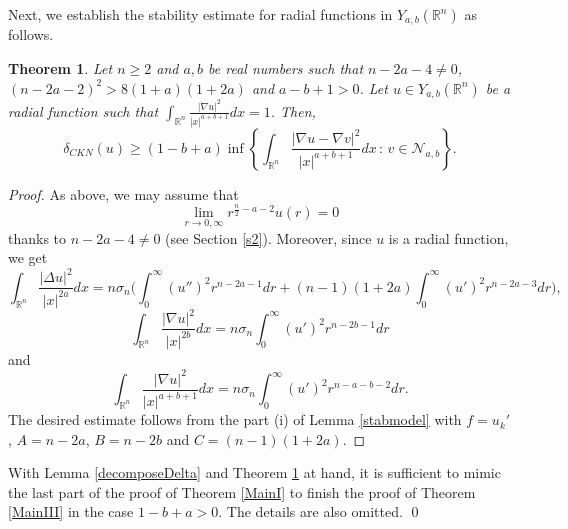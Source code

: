\documentclass[a4paper,12pt]{article}
\theoremstyle{plain}
\newtheorem{theorem}{Theorem}[section]
\theoremstyle{definition}
\theoremstyle{remark}
\def\R{\mathbb R}%
\def\irn{\int_{\R^n}}
\numberwithin{equation}{section}
\begin{document}
Next, we establish the stability estimate for radial functions in $Y_{a,b}(\R^n)$ as follows.
\begin{theorem}\label{radialtheoDelta}
Let $n\geq 2$ and $a, b$ be real numbers such that $n-2a -4\not=0$, $(n-2a -2)^2 > 8(1+a)(1+2a)$ and $a-b +1 >0$. Let $u \in Y_{a,b}(\R^n)$ be a radial function such that $\irn \frac{|\nabla u|^2}{|x|^{a+b+1}} dx =1$. Then,
\begin{equation*}%
\delta_{CKN} (u) \geq (1-b +a) \inf\left\{\irn \frac{|\nabla u - \nabla v|^2}{|x|^{a+b+1}} dx\, :\, v \in \mathcal N_{a,b}\right\}.
\end{equation*}
\end{theorem}
\begin{proof}
As above, we  may  assume that
\[
\lim_{r\to 0, \infty} r^{\frac n2 -a -2} u(r) =0
\]
thanks to  $n-2a-4 \not=0$ (see Section \ref{s2}). Moreover, since $u$ is a radial function, we get 
\[
\irn \frac{|\Delta u|^2}{|x|^{2a}} dx =n\sigma_n \Bigg(\int_0^\infty (u'')^2 r^{n-2a -1} dr + (n-1)(1+2a) \int_0^\infty (u')^2 r^{n-2a -3} dr \Bigg),
\]
\[
\irn \frac{|\nabla u|^2}{|x|^{2b}} dx = n\sigma_n  \int_0^\infty (u')^2 r^{n-2b -1} dr
\]
and
\[
\irn \frac{|\nabla u|^2}{|x|^{a+b+1}} dx = n\sigma_n \int_0^\infty (u')^2 r^{n-a -b -2} dr.
\]
The desired estimate follows from the part (i) of Lemma \ref{stabmodel} with $f = u_k'$, $A =n -2a$, $B = n-2b$ and $C =(n-1)(1 +2a)$.
\end{proof}
With Lemma \ref{decomposeDelta} and Theorem \ref{radialtheoDelta} at hand, it is sufficient to mimic the last part of the proof of Theorem \ref{MainI} to finish the proof of Theorem \ref{MainIII} in the case $1-b+a >0$. The details are also omitted. \qed
\end{document}
